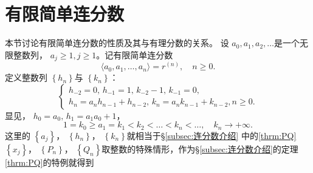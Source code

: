 \section{有限简单连分数}
\setcounter{equation}{0}
\setcounter{theorem}{0}
本节讨论有限简单连分数的性质及其与有理分数的关系。
设 \( a_0, a_1, a_2, \dots \)是一个无限整数列， \( a_j \ge 1, j \ge 1 \)。记有限简单连分数
\begin{equation}
	\langle a_0, a_1, \dots, a_n \rangle = r^{(n)}, \quad n \ge 0. \label{eq:有限简单连分数}
\end{equation}
定义整数列 \( \left\{ h_n\right\} \)与 	\( \left\{k_n\right\} \)：
\begin{equation}\label{eq:hk定义}
	\begin{cases}
		h_{-2} = 0,\, h_{-1} = 1,\, k_{-2} - 1,\, k_{-1} = 0, \\
		h_n = a_nh_{n-1} + h_{n-2},\, k_n = a_nk_{n-1} + k_{n-2}, n \ge 0 .
	\end{cases}
\end{equation}
显见， \( h_0 = a_0,\, h_1 = a_1a_0 + 1 \)，
\begin{equation}
	1 = k_0 \ge a_1 = k_1 < k_2 < \dots < k_n < \dots, \quad k_n \to + \infty .
\end{equation}
这里的 \( \left\{ a_j \right\} \)， \(\left\{ h_n \right\}\)， \(\left\{ k_n
\right\}\)就相当于\S\ref{subsec:连分数介绍} 中的\eqref{thrm:PQ} \(\left\{ x_j \right\}\)， \(\left\{ P_n \right\}\)，
\(\left\{ Q_n \right\}\)取整数的特殊情形，作为\S\ref{subsec:连分数介绍}的定理\ref{thrm:PQ}的特例就得到
